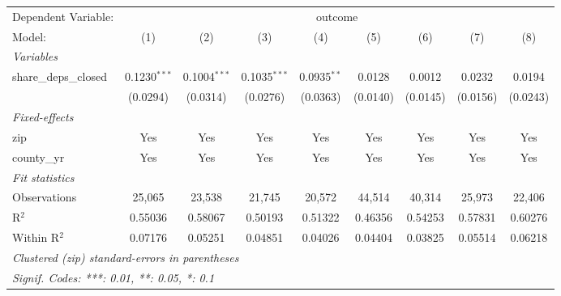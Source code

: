\begingroup
\centering
\begin{tabular}{lcccccccc}
   \tabularnewline \midrule \midrule
   Dependent Variable: & \multicolumn{8}{c}{outcome}\\
   Model:                & (1)            & (2)            & (3)            & (4)           & (5)      & (6)      & (7)      & (8)\\  
   \midrule
   \emph{Variables}\\
   share\_deps\_closed   & 0.1230$^{***}$ & 0.1004$^{***}$ & 0.1035$^{***}$ & 0.0935$^{**}$ & 0.0128   & 0.0012   & 0.0232   & 0.0194\\   
                         & (0.0294)       & (0.0314)       & (0.0276)       & (0.0363)      & (0.0140) & (0.0145) & (0.0156) & (0.0243)\\   
   \midrule
   \emph{Fixed-effects}\\
   zip                   & Yes            & Yes            & Yes            & Yes           & Yes      & Yes      & Yes      & Yes\\  
   county\_yr            & Yes            & Yes            & Yes            & Yes           & Yes      & Yes      & Yes      & Yes\\  
   \midrule
   \emph{Fit statistics}\\
   Observations          & 25,065         & 23,538         & 21,745         & 20,572        & 44,514   & 40,314   & 25,973   & 22,406\\  
   R$^2$                 & 0.55036        & 0.58067        & 0.50193        & 0.51322       & 0.46356  & 0.54253  & 0.57831  & 0.60276\\  
   Within R$^2$          & 0.07176        & 0.05251        & 0.04851        & 0.04026       & 0.04404  & 0.03825  & 0.05514  & 0.06218\\  
   \midrule \midrule
   \multicolumn{9}{l}{\emph{Clustered (zip) standard-errors in parentheses}}\\
   \multicolumn{9}{l}{\emph{Signif. Codes: ***: 0.01, **: 0.05, *: 0.1}}\\
\end{tabular}
\par\endgroup
